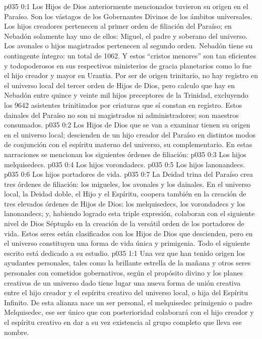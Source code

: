 \author{Jefe de los arcángeles}
\vs p035 0:1 Los Hijos de Dios anteriormente mencionados tuvieron su origen en el Paraíso. Son los vástagos de los Gobernantes Divinos de los ámbitos universales. Los hijos creadores pertenecen al primer orden de filiación del Paraíso; en Nebadón solamente hay uno de ellos: Miguel, el padre y soberano del universo. Los avonales o hijos magistrados pertenecen al segundo orden. Nebadón tiene su contingente íntegro: un total de 1062. Y estos “cristos menores” son tan eficientes y todopoderosos en sus respectivos ministerios de gracia planetarios como lo fue el hijo creador y mayor en Urantia. Por ser de origen trinitario, no hay registro en el universo local del tercer orden de Hijos de Dios, pero calculo que hay en Nebadón entre quince y veinte mil hijos preceptores de la Trinidad, excluyendo los 9642 asistentes trinitizados por criaturas que sí constan en registro. Estos dainales del Paraíso no son ni magistrados ni administradores; son maestros consumados.
\vs p035 0:2 Los Hijos de Dios que se van a examinar tienen su origen en el universo local; descienden de un hijo creador del Paraíso en distintos modos de conjunción con el espíritu materno del universo, su complementario. En estas narraciones se mencionan los siguientes órdenes de filiación:
\vs p035 0:3 Los hijos melquisedecs.
\vs p035 0:4 Los hijos vorondadecs.
\vs p035 0:5 Los hijos lanonandecs.
\vs p035 0:6 Los hijos portadores de vida.
\vs p035 0:7 \pc La Deidad trina del Paraíso crea tres órdenes de filiación: los migueles, los avonales y los dainales. En el universo local, la Deidad doble, el Hijo y el Espíritu, coopera también en la creación de tres elevados órdenes de Hijos de Dios: los melquisedecs, los vorondadecs y los lanonandecs; y, habiendo logrado esta triple expresión, colaboran con el siguiente nivel de Dios Séptuplo en la creación de la versátil orden de los portadores de vida. Estos seres están clasificados con los Hijos de Dios que descienden, pero en el universo constituyen una forma de vida única y primigenia. Todo el siguiente escrito está dedicado a su estudio.
\vs p035 1:1 Una vez que han tenido origen los ayudantes personales, tales como la brillante estrella de la mañana y otros seres personales con cometidos gobernativos, según el propósito divino y los planes creativos de un universo dado tiene lugar una nueva forma de unión creativa entre el hijo creador y el espíritu creativo del universo local, o hija del Espíritu Infinito. De esta alianza nace un ser personal, el melquisedec primigenio o padre Melquisedec, ese ser único que con posterioridad colaborará con el hijo creador y el espíritu creativo en dar a su vez existencia al grupo completo que lleva ese nombre.
